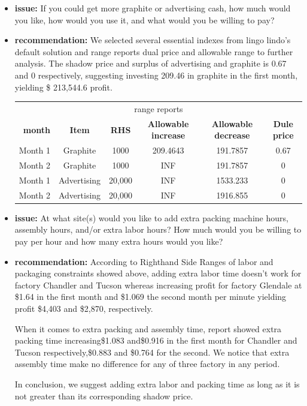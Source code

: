 \documentclass[12pt]{article}
\begin{document}
\begin{itemize}

	\item \textbf{issue:} If you could get more graphite or advertising cash, how much would you like, how would you use it, and what would you be willing to pay?
	
	\item \textbf{recommendation:}
	We selected several essential indexes from lingo lindo’s default solution and range reports dual price and allowable range to further analysis.
The shadow price and surplus of advertising and graphite is 0.67 and 0 respectively, suggesting investing 209.46 in graphite in the first month, yielding \$ 213,544.6 profit.\par
\begin{center}
\begin{tabular}{c c c c c c }
\hline
\multicolumn{6}{c}{range reports} \\
\ \textbf{month} &\textbf{Item} &\textbf{RHS} & \textbf{Allowable increase} & \textbf{Allowable decrease} &  \textbf{Dule price}\\
\hline
Month 1     &Graphite    &1000       &209.4643   &191.7857        &0.67\\
Month 2     &Graphite    &1000       &INF        &191.7857    &0\\
Month 1     &Advertising    &20,000     &INF    &1533.233        &0\\
Month 2     &Advertising    &20,000     &INF    &1916.855       &0\\
\hline
\end{tabular}
\end{center}


	
	\item \textbf{issue:} At what site(s) would you like to add extra packing machine hours, assembly hours, and/or extra labor hours? How much would you be willing to pay per hour and how many extra hours would you like?
	

	\item \textbf{recommendation:}
		According to Righthand Side Ranges of labor and packaging constraints showed above, 
		adding extra labor time doesn't work for factory Chandler and Tucson whereas increasing profit for factory Glendale at \$1.64 in the first month and \$1.069 the second month per minute yielding profit \$4,403 and \$2,870, respectively.
		
		\par
		When it comes to extra packing and assembly time, report showed extra packing time increasing\$1.083 and\$0.916 in the first month for Chandler and Tucson respectively,\$0.883 and \$0.764 for the second. We notice that extra assembly time make no difference for any of three factory in any period.
		\par
		In conclusion, we suggest adding extra labor and packing time as long as it is not greater than its corresponding shadow price.
		\par
	

\end{itemize}
\end{document}
